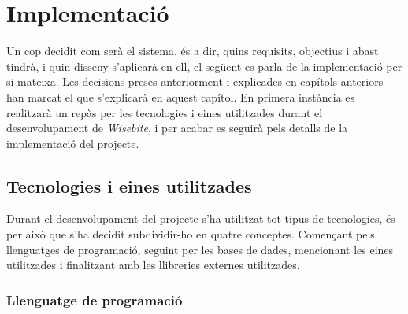 
\chapter{Implementació} %

\label{Chapter7} %

Un cop decidit com serà el sistema, és a dir, quins requisits, objectius i abast tindrà, i quin disseny s'aplicarà en ell, el següent es parla de la implementació per si mateixa. Les decisions preses anteriorment i explicades en capítols anteriors han marcat el que s'explicarà en aquest capítol. En primera instància es realitzarà un repàs per les tecnologies i eines utilitzades durant el desenvolupament de \textit{Wisebite}, i per acabar es seguirà pels detalls de la implementació del projecte.


\section{Tecnologies i eines utilitzades}

Durant el desenvolupament del projecte s'ha utilitzat tot tipus de tecnologies, és per això que s'ha decidit subdividir-ho en quatre conceptes. Començant pels llenguatges de programació, seguint per les bases de dades, mencionant les eines utilitzades i finalitzant amb les llibreries externes utilitzades.

\subsection{Llenguatge de programació}

